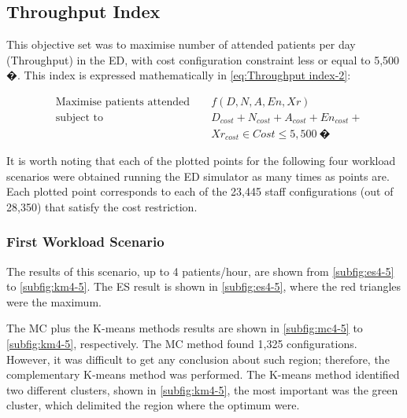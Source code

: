 \subsection{Throughput Index}

This objective set was to maximise number of attended patients per
day (Throughput) in the ED, with cost configuration constraint less
or equal to 5,500 �. This index is expressed mathematically in \ref{eq:Throughput index-2}:

\begin{equation}
\begin{aligned} & {\text{Maximise patients attended }} &  & f(D,N,A,En,Xr)\\
 & \text{subject to} &  & D_{cost}+N_{cost}+A_{cost}+En_{cost}+\\
 &  &  & Xr_{cost}\in Cost\leq5,500\:\text{�}
\end{aligned}
\label{eq:Throughput index-2}
\end{equation}


It is worth noting that each of the plotted points for the following
four workload scenarios were obtained running the ED simulator as
many times as points are. Each plotted point corresponds to each of
the 23,445 staff configurations (out of 28,350) that satisfy the cost
restriction.


\subsubsection{First Workload Scenario}

The results of this scenario, up to 4 patients/hour, are shown from
\ref{subfig:es4-5} to \ref{subfig:km4-5}. The ES result is shown
in \ref{subfig:es4-5}, where the red triangles were the maximum. 

The MC plus the K-means methods results are shown in \ref{subfig:mc4-5}
to \ref{subfig:km4-5}, respectively. The MC method found 1,325 configurations.
However, it was difficult to get any conclusion about such region;
therefore, the complementary K-means method was performed. The K-means
method identified two different clusters, shown in \ref{subfig:km4-5},
the most important was the green cluster, which delimited the region
where the optimum were.

